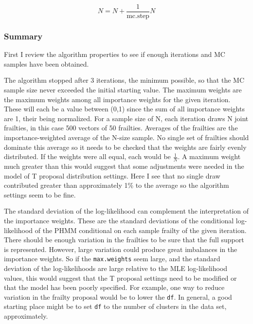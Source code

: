 \[
N = N + \frac{1}{\mbox{mc.step}}N
\]


\subsubsection{Summary}

First I review the algorithm properties to see if enough iterations
and MC samples have been obtained. 

\begin{Schunk}
\end{Schunk}

The algorithm stopped after 3 iterations, the minimum possible, so
that the MC sample size never exceeded the initial starting value. The
maximum weights are the maximum weights among all importance weights
for the given iteration. These will each be a value between (0,1)
since the sum of all importance weights are 1, their being
normalized. For a sample size of N, each iteration draws N joint
frailties, in this case 500 vectors of 50 frailties. Averages of the frailties are
the importance-weighted average of the N-size sample. No single set of
frailties should dominate this average so it needs to be checked that
the weights are fairly evenly distributed. If the weights were all
equal, each would be $$. A maximum weight much greater than
this would suggest that some adjustments were needed in the model of T
proposal distribution settings. Here I see that no single draw
contributed greater than approximately 1\% to the average so the
algorithm settings seem to be fine.

The standard deviation of the log-likelihood can complement the
interpretation of the importance weights. These are the standard
deviations of the conditional log-likelihood of the PHMM conditional
on each
sample frailty of the given iteration. There should be enough
variation in the frailties to be sure that the full support is
represented. However, large variation could produce great imbalances
in the importance weights. So if the \texttt{max.weights} seem large, and the
standard deviation of the log-likelihoods are large relative to the
MLE log-likelihood values, this would suggest that the T proposal
settings need to be modified or that the model has been poorly
specified. For example, one way to reduce variation in the frailty
proposal would be to lower the \texttt{df}. In general, a good
starting place might be to set \texttt{df} to the number of clusters
in the data set, approximately.


